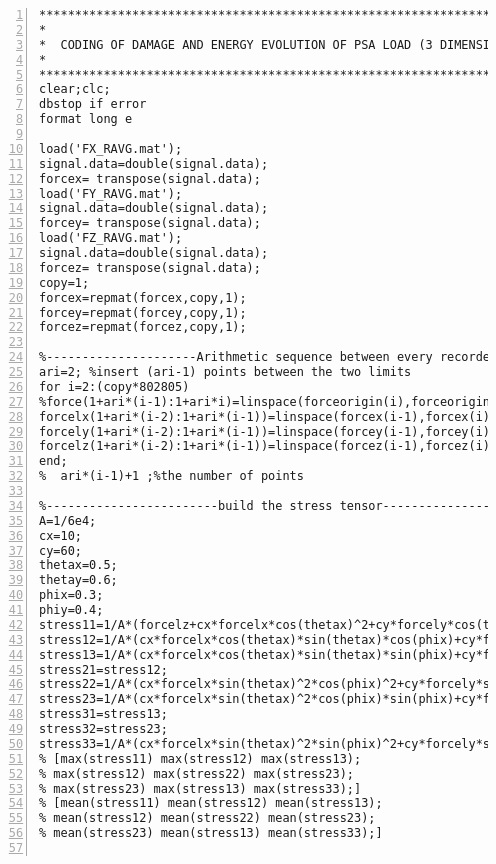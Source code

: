 \clearpage
\begin{lstlisting}[numbers=left, numberstyle=\tiny, keywordstyle=\color{blue!100}, commentstyle=\color{red!30!green!100!blue!100}, frame=shadowbox, rulesepcolor=\color{red!20!green!20!blue!20}]
***********************************************************************
*
*  CODING OF DAMAGE AND ENERGY EVOLUTION OF PSA LOAD (3 DIMENSIONAL)
*               
***********************************************************************
clear;clc;
dbstop if error
format long e

load('FX_RAVG.mat');
signal.data=double(signal.data);
forcex= transpose(signal.data);
load('FY_RAVG.mat');
signal.data=double(signal.data);
forcey= transpose(signal.data);
load('FZ_RAVG.mat');
signal.data=double(signal.data);
forcez= transpose(signal.data);
copy=1;
forcex=repmat(forcex,copy,1);
forcey=repmat(forcey,copy,1);
forcez=repmat(forcez,copy,1);

%---------------------Arithmetic sequence between every recorded points---------------------
ari=2; %insert (ari-1) points between the two limits
for i=2:(copy*802805)
%force(1+ari*(i-1):1+ari*i)=linspace(forceorigin(i),forceorigin(i+1),ari+1);
forcelx(1+ari*(i-2):1+ari*(i-1))=linspace(forcex(i-1),forcex(i),ari+1);
forcely(1+ari*(i-2):1+ari*(i-1))=linspace(forcey(i-1),forcey(i),ari+1);
forcelz(1+ari*(i-2):1+ari*(i-1))=linspace(forcez(i-1),forcez(i),ari+1);
end;
%  ari*(i-1)+1 ;%the number of points

%------------------------build the stress tensor---------------------
A=1/6e4;
cx=10;
cy=60;
thetax=0.5;
thetay=0.6;
phix=0.3;
phiy=0.4;
stress11=1/A*(forcelz+cx*forcelx*cos(thetax)^2+cy*forcely*cos(thetay)^2);
stress12=1/A*(cx*forcelx*cos(thetax)*sin(thetax)*cos(phix)+cy*forcely*cos(thetay)*sin(thetay)*cos(phiy));
stress13=1/A*(cx*forcelx*cos(thetax)*sin(thetax)*sin(phix)+cy*forcely*cos(thetay)*sin(thetay)*sin(phiy));
stress21=stress12;
stress22=1/A*(cx*forcelx*sin(thetax)^2*cos(phix)^2+cy*forcely*sin(thetay)^2*cos(phiy)^2);
stress23=1/A*(cx*forcelx*sin(thetax)^2*cos(phix)*sin(phix)+cy*forcely*sin(thetay)^2*cos(phiy)*sin(phiy));
stress31=stress13;
stress32=stress23;
stress33=1/A*(cx*forcelx*sin(thetax)^2*sin(phix)^2+cy*forcely*sin(thetay)^2*sin(phiy)^2);
% [max(stress11) max(stress12) max(stress13);
% max(stress12) max(stress22) max(stress23);
% max(stress23) max(stress13) max(stress33);]
% [mean(stress11) mean(stress12) mean(stress13);
% mean(stress12) mean(stress22) mean(stress23);
% mean(stress23) mean(stress13) mean(stress33);]


\end{lstlisting}

